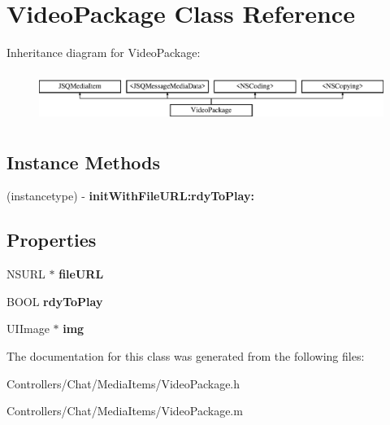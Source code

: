 \hypertarget{interface_video_package}{}\section{Video\+Package Class Reference}
\label{interface_video_package}
Inheritance diagram for Video\+Package\+:\begin{figure}[H]
\begin{center}
\leavevmode
\includegraphics[height=1.637427cm]{interface_video_package}
\end{center}
\end{figure}
\subsection*{Instance Methods}
\begin{DoxyCompactItemize}
\item 
\hypertarget{interface_video_package_ad28ca2e996e5061e751f3ec8eb5185cb}{}(instancetype) -\/ {\bfseries init\+With\+File\+U\+R\+L\+:rdy\+To\+Play\+:}\label{interface_video_package_ad28ca2e996e5061e751f3ec8eb5185cb}

\end{DoxyCompactItemize}
\subsection*{Properties}
\begin{DoxyCompactItemize}
\item 
\hypertarget{interface_video_package_a6af849878c6753ee53b99a7c32f1b191}{}N\+S\+U\+R\+L $\ast$ {\bfseries file\+U\+R\+L}\label{interface_video_package_a6af849878c6753ee53b99a7c32f1b191}

\item 
\hypertarget{interface_video_package_a4c7b51d3b532fe14d03ffeb8fb542fa2}{}B\+O\+O\+L {\bfseries rdy\+To\+Play}\label{interface_video_package_a4c7b51d3b532fe14d03ffeb8fb542fa2}

\item 
\hypertarget{interface_video_package_a33cbf7a3fcc80d1a153a77d6667ded69}{}U\+I\+Image $\ast$ {\bfseries img}\label{interface_video_package_a33cbf7a3fcc80d1a153a77d6667ded69}

\end{DoxyCompactItemize}


The documentation for this class was generated from the following files\+:\begin{DoxyCompactItemize}
\item 
Controllers/\+Chat/\+Media\+Items/Video\+Package.\+h\item 
Controllers/\+Chat/\+Media\+Items/Video\+Package.\+m\end{DoxyCompactItemize}

